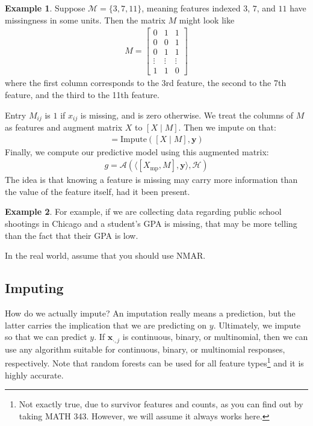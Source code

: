 \documentclass[12pt, a4paper]{article}
\theoremstyle{definition}
\newtheorem*{example}{Example}
\begin{document}
	\begin{tcolorbox}
		\begin{example}
			Suppose $\mathcal{M} = \{3, 7, 11\}$, meaning features indexed $3$, $7$,
			and $11$ have missingness in some units. Then the matrix $M$ might look like
			\begin{align*}
				M = \begin{bmatrix}
					0 & 1 & 1\\
					0 & 0 & 1\\
					0 & 1 & 1\\
					\vdots & \vdots & \vdots\\
					1 & 1 & 0
				\end{bmatrix}
			\end{align*}
			where the first column corresponds to the 3rd feature, the
			second to the 7th feature, and the third to the 11th feature.
		\end{example}
	\end{tcolorbox}
	Entry $M_{ij}$ is $1$ if $x_{ij}$ is missing, and is zero otherwise.
	We treat the columns of $M$ as features and augment matrix $X$
	to $[X \mid M]$. Then we impute on that:
	\begin{align*}
		[X_{\text{imp}} \mid M] = \text{Impute}([X\mid M], \bm{y})
	\end{align*}
	Finally, we compute our predictive model using this augmented matrix:
	\begin{align*}
		g = \mathcal{A}(\langle [X_{\text{mp}}, M], \bm{y}\rangle, \mathcal{H})
	\end{align*}
	The idea is that knowing a feature is missing may carry more information
	than the value of the feature itself, had it been present.
	\begin{tcolorbox}
		\begin{example}
			 For example,
			if we are collecting data regarding public school shootings in Chicago
			and a student's GPA is missing, that may be more telling than the
			fact that their GPA is low.
		\end{example}
	\end{tcolorbox}
	In the real world, assume that you should use NMAR.
	\subsection{Imputing}
	How do we actually impute? An imputation really means a prediction,
	but the latter carries the implication that we are predicting on $y$.
	Ultimately, we impute so that we can predict $y$. If $\bm{x}_{\cdot, j}$
	is continuous, binary, or multinomial, then we can use any algorithm
	suitable for continuous, binary, or multinomial responses, respectively.
	Note that random forests can be used for all feature
	types\footnote{Not exactly true, due to survivor features and counts, as you can find
		out by taking MATH 343. However, we will assume it always works here.
	}
	and it is highly accurate.
	
\end{document}
